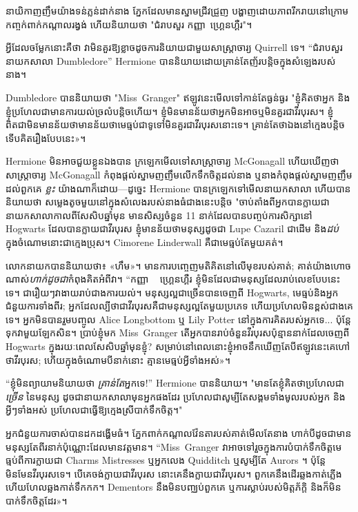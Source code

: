នាយិកាញញឹមយ៉ាងទន់ភ្លន់ដាក់នាង ភ្នែកដែលមានស្នាមជ្រីវជ្រួញ បង្ហាញដោយភាពរីករាយនៅក្រោមកញ្ចក់ពាក់កណ្តាលរង្វង់ ហើយនិយាយថា "ជំរាបសួរ កញ្ញា~ហ្គ្រេនហ្គឺរ"។

អ្វី​ដែល​ចម្លែក​នោះ​គឺ​ថា វា​មិន​គួរ​ឱ្យ​ខ្លាច​ដូច​ការ​និយាយ​ជាមួយ​សាស្ត្រាចារ្យ Quirrell ទេ។ “ជំរាបសួរ នាយកសាលា Dumbledore” Hermione បាននិយាយដោយគ្រាន់តែញ័របន្តិចក្នុងសំឡេងរបស់នាង។

Dumbledore បាននិយាយថា "Miss~Granger" ឥឡូវនេះមើលទៅកាន់តែធ្ងន់ធ្ងរ "ខ្ញុំគិតថាអ្នក និងខ្ញុំប្រហែលជាមានការយល់ច្រលំបន្តិចហើយ។ ខ្ញុំ​មិន​មាន​ន័យ​ថា​អ្នក​មិន​អាច​ឬ​មិន​គួរ​ជា​វីរបុរស​។ ខ្ញុំពិតជាមិនមានន័យថាមានន័យថាមេធ្មប់ជាទូទៅមិនគួរជាវីរបុរសនោះទេ។ គ្រាន់​តែ​ថា​ឯង​នៅ​ក្មេង​បន្តិច​ទើប​គិត​រឿង​បែប​នេះ​»។

Hermione មិនអាចជួយខ្លួនឯងបាន ក្រឡេកមើលទៅសាស្រ្តាចារ្យ McGonagall ហើយឃើញថាសាស្រ្តាចារ្យ McGonagall កំពុងផ្តល់ស្នាមញញឹមលើកទឹកចិត្តដល់នាង ឬនាងកំពុងផ្តល់ស្នាមញញឹមដល់ពួកគេ \emph{ខ្លះ} យ៉ាងណាក៏ដោយ—ដូច្នេះ Hermione បានក្រឡេកទៅមើលនាយកសាលា ហើយបាននិយាយថា សម្លេងតូចមួយនៅក្នុងសំលេងរបស់នាងធំជាងនេះបន្តិច "ចាប់តាំងពីអ្នកបានក្លាយជានាយកសាលាកាលពីសែសិបឆ្នាំមុន មានសិស្សចំនួន 11 នាក់ដែលបានបញ្ចប់ការសិក្សានៅ Hogwarts ដែលបានក្លាយជាវីរបុរស ខ្ញុំមានន័យថាមនុស្សដូចជា Lupe Cazaril ជាដើម និង\emph {ដប់} ក្នុង​ចំណោម​នោះ​ជា​ក្មេង​ប្រុស។ Cimorene Linderwall គឺជាមេធ្មប់តែមួយគត់។

លោក​នាយក​បាន​និយាយ​ថា​៖ «​ហឹម​»។ មាន​ការ​បញ្ចេញ​មតិ​គិត​នៅ​លើ​មុខ​របស់​គាត់; គាត់យ៉ាងហោចណាស់\emph{ហាក់ដូចជា}កំពុងគិតអំពីវា។ “កញ្ញា ~ ហ្គ្រេនហ្គឺរ ខ្ញុំមិនដែលជាមនុស្សដែលរាប់លេខបែបនេះទេ។ ជារឿយៗវាងាយរាប់ជាងការយល់។ មនុស្សល្អជាច្រើនបានចេញពី Hogwarts, មេធ្មប់និងអ្នកជំនួយការទាំងពីរ; អ្នក​ដែល​ល្បី​ថា​ជា​វីរបុរស​គឺ​ជា​មនុស្ស​ល្អ​តែ​មួយ​ប្រភេទ ហើយ​ប្រហែល​មិន​ខ្ពស់​ជាង​គេ​ទេ។ អ្នកមិនបានរួមបញ្ចូល Alice Longbottom ឬ Lily Potter នៅក្នុងការគិតរបស់អ្នកទេ... ប៉ុន្តែទុកវាមួយឡែកសិន។ ប្រាប់ខ្ញុំមក Miss~Granger តើអ្នកបានរាប់ចំនួនវីរបុរសប៉ុន្មាននាក់ដែលចេញពី Hogwarts ក្នុងរយៈពេលសែសិបឆ្នាំមុនខ្ញុំ? សម្រាប់​នៅ​ពេល​នោះ​ខ្ញុំ​អាច​នឹក​ឃើញ​តែ​បី​ឥឡូវ​នេះ​គេ​ហៅ​ថា​វីរបុរស; ហើយ​ក្នុង​ចំណោម​បី​នាក់​នោះ គ្មាន​មេធ្មប់​អ្វី​ទាំង​អស់»។

“ខ្ញុំមិនព្យាយាមនិយាយថា \emph{គ្រាន់តែ}អ្នកទេ!” Hermione បាននិយាយ។ "មានតែខ្ញុំគិតថាប្រហែលជា \emph{ច្រើន} នៃមនុស្ស ដូចជានាយកសាលាមុនអ្នកផងដែរ ប្រហែលជាសូម្បីតែសង្គមទាំងមូលរបស់អ្នក និងអ្វីៗទាំងអស់ ប្រហែលជាធ្វើឱ្យក្មេងស្រីបាក់ទឹកចិត្ត។"

អ្នកជំនួយការចាស់បានដកដង្ហើមធំ។ ភ្នែកពាក់កណ្តាលវ៉ែនតារបស់គាត់មើលតែនាង ហាក់បីដូចជាមានមនុស្សតែពីរនាក់ប៉ុណ្ណោះដែលមានវត្តមាន។ “Miss~Granger វាអាចទៅរួចក្នុងការបំបាក់ទឹកចិត្តមេធ្មប់ពីការក្លាយជា Charms Mistresses ឬអ្នកលេង Quidditch ឬសូម្បីតែ Aurors ។ ប៉ុន្តែមិនមែនវីរបុរសទេ។ បើគេចង់ក្លាយជាវីរបុរស នោះគេនឹងក្លាយជាវីរបុរស។ ពួកគេនឹងដើរឆ្លងកាត់ភ្លើង ហើយហែលឆ្លងកាត់ទឹកកក។ Dementors នឹង​មិន​បញ្ឈប់​ពួកគេ ឬ​ការ​ស្លាប់​របស់​មិត្តភ័ក្តិ និង​ក៏​មិន​បាក់​ទឹកចិត្ត​ដែរ»។

